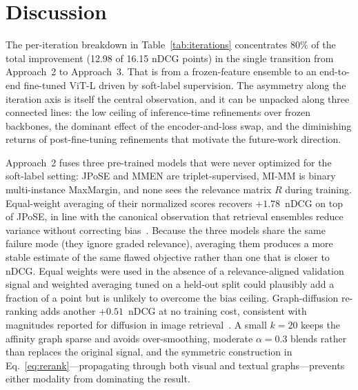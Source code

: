 \section{Discussion}
\label{sec:discussion}

The per-iteration breakdown in Table~\ref{tab:iterations} concentrates 80\% of the total improvement (12.98 of 16.15 nDCG points) in the single transition from Approach~2 to Approach~3. That is from a frozen-feature ensemble to an end-to-end fine-tuned ViT-L driven by soft-label supervision. The asymmetry along the iteration axis is itself the central observation, and it can be unpacked along three connected lines: the low ceiling of inference-time refinements over frozen backbones, the dominant effect of the encoder-and-loss swap, and the diminishing returns of post-fine-tuning refinements that motivate the future-work direction.

Approach~2 fuses three pre-trained models that were never optimized for the soft-label setting: JPoSE and MMEN are triplet-supervised, MI-MM is binary multi-instance MaxMargin, and none sees the relevance matrix $R$ during training. Equal-weight averaging of their normalized scores recovers $+1.78$~nDCG on top of JPoSE, in line with the canonical observation that retrieval ensembles reduce variance without correcting bias~\cite{wortsman2022modelsoups}. Because the three models share the same failure mode (they ignore graded relevance), averaging them produces a more stable estimate of the same flawed objective rather than one that is closer to nDCG. Equal weights were used in the absence of a relevance-aligned validation signal and weighted averaging tuned on a held-out split could plausibly add a fraction of a point but is unlikely to overcome the bias ceiling. Graph-diffusion re-ranking adds another $+0.51$~nDCG at no training cost, consistent with magnitudes reported for diffusion in image retrieval~\cite{iscen2017diffusion}. A small $k=20$ keeps the affinity graph sparse and avoids over-smoothing, moderate $\alpha=0.3$ blends rather than replaces the original signal, and the symmetric construction in Eq.~\eqref{eq:rerank}---propagating through both visual and textual graphs---prevents either modality from dominating the result.

